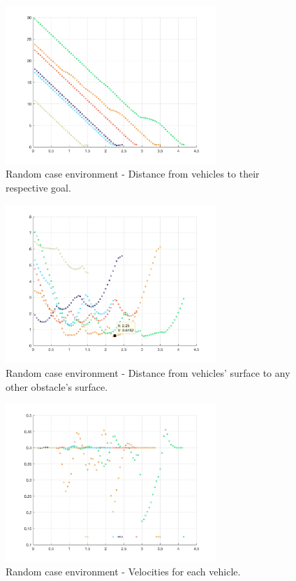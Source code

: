 \documentclass[journal]{IEEEtran}
\begin{document}
		\begin{figure}[H]
			\centering
			\includegraphics[width=8cm]{Results/Potentialfields/goal}
			\caption{Random case environment - Distance from vehicles to their respective goal.}
			\label{fig:goal}
		\end{figure}
		\begin{figure}[H]
			\centering
			\includegraphics[width=8cm]{Results/Potentialfields/obst}
			\caption{Random case environment - Distance from vehicles' surface to any other obstacle's surface.}
			\label{fig:obst}
		\end{figure}
	
		\begin{figure}[H]
			\centering
			\includegraphics[width=8cm]{Results/Potentialfields/vel}
			\caption{Random case environment - Velocities for each vehicle.}
			\label{fig:vel}
		\end{figure}
\end{document}
